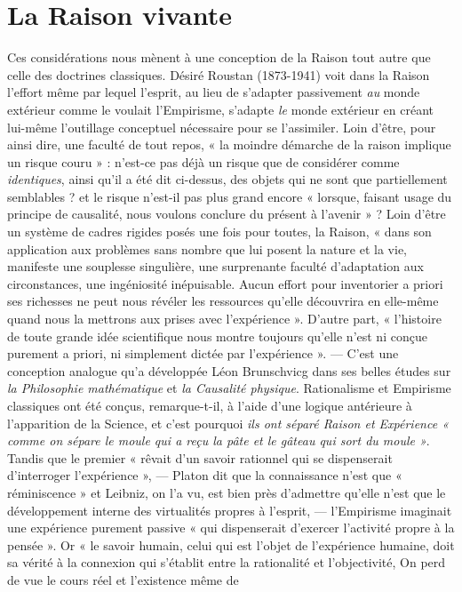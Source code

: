 \section{La Raison vivante}%
Ces considérations nous mènent à
une conception de la Raison tout autre que celle des doctrines classiques. Désiré Roustan (1873-1941) voit dans la Raison l’effort
même par lequel l’esprit, au lieu de s’adapter passivement {\it au} monde
extérieur comme le voulait l’Empirisme, s’adapte {\it le} monde extérieur
en créant lui-même l’outillage conceptuel nécessaire pour se l’assimiler.
Loin d’être, pour ainsi dire, une faculté de tout repos, « la moindre
démarche de la raison implique un risque couru » : n’est-ce pas déjà
un risque que de considérer comme {\it identiques}, ainsi qu’il a été dit
ci-dessus, des objets qui ne sont que partiellement semblables ? et le
risque n'est-il pas plus grand encore « lorsque, faisant usage du principe de causalité, nous voulons conclure du présent à l’avenir » ?
Loin d’être un système de cadres rigides posés une fois pour toutes,
la Raison, « dans son application aux problèmes sans nombre que lui
posent la nature et la vie, manifeste une souplesse singulière, une surprenante faculté d'adaptation aux circonstances, une ingéniosité
inépuisable. Aucun effort pour inventorier a priori ses richesses ne
peut nous révéler les ressources qu’elle découvrira en elle-même
quand nous la mettrons aux prises avec l’expérience ». D’autre part,
« l’histoire de toute grande idée scientifique nous montre toujours
qu’elle n’est ni conçue purement a priori, ni simplement dictée par
l'expérience ». — C'est une conception analogue qu’a développée
Léon Brunschvicg dans ses belles études sur {\it la Philosophie mathématique} et {\it la Causalité physique}. Rationalisme et Empirisme classiques
ont été conçus, remarque-t-il, à l’aide d’une logique antérieure à
l'apparition de la Science, et c’est pourquoi {\it ils ont séparé Raison et
Expérience « comme on sépare le moule qui a reçu la pâte et le gâteau
qui sort du moule »}. Tandis que le premier « rêvait d’un savoir rationnel
qui se dispenserait d'interroger l'expérience », — Platon dit que la
connaissance n’est que « réminiscence » et Leibniz, on l’a vu, est bien
près d'admettre qu’elle n’est que le développement interne des virtualités propres à l’esprit, — l’Empirisme imaginait une expérience
purement passive « qui dispenserait d'exercer l’activité propre à la
pensée ». Or « le savoir humain, celui qui est l’objet de l'expérience
humaine, doit sa vérité à la connexion qui s’établit entre la rationalité et l’objectivité, On perd de vue le cours réel et l’existence même de
